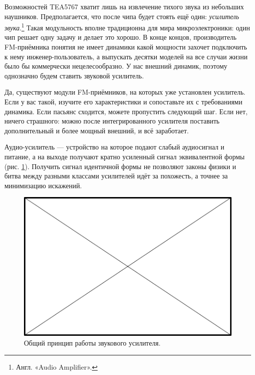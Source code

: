 Возможностей TEA5767 хватит лишь на извлечение тихого звука из небольших наушников. Предполагается, что после чипа будет стоять ещё один: \emph{усилитель звука}.\footnote{Англ. «Audio Amplifier».} Такая модульность вполне традиционна для мира микроэлектроники: один чип решает одну задачу и делает это хорошо. В конце концов, производитель FM-приёмника понятия не имеет динамики какой мощности захочет подключить к нему инженер-пользователь, а выпускать десятки моделей на все случаи жизни было бы коммерчески нецелесообразно. У нас внешний динамик, поэтому однозначно будем ставить звуковой усилитель.

\begin{Note}
  Да, существуют модули FM-приёмников, на которых уже установлен усилитель. Если у вас такой, изучите его характеристики и сопоставьте их с требованиями динамика. Если пасьянс сходится, можете пропустить следующий шаг. Если нет, ничего страшного: можно после интегрированного усилителя поставить дополнительный и более мощный внешний, и всё заработает.
\end{Note}

Аудио-усилитель — устройство на которое подают слабый аудиосигнал и питание, а на выходе получают кратно усиленный сигнал эквивалентной формы (рис. \ref{fig:sound-amp-diagram}). Получить сигнал идентичной формы не позволяют законы физики и битва между разными классами усилителей идёт за похожесть, а точнее за минимизацию искажений.

\begin{figure}
  \centering
  \includegraphics{TODO.png}
  \caption{Общий принцип работы звукового усилителя.}
  \label{fig:sound-amp-diagram}
\end{figure}

